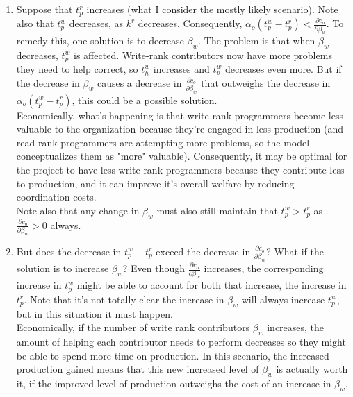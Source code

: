 \documentclass[source/paper/main.tex]{subfiles}
\begin{document}
\begin{enumerate}
    \item Suppose that $t_p^r$ increases (what I consider the mostly likely scenario). Note also that $t_p^w$ decreases, as $k^r$ decreases. Consequently, $\alpha_o(t_p^w - t_p^r) < \frac{\partial c_o}{\partial \beta_w}$. To remedy this, one solution is to decrease $\beta_w$. The problem is that when $\beta_w$ decreases, $t_p^w$ is affected. Write-rank contributors now have more problems they need to help correct, so $t_h^w$ increases and $t_p^w$ decreases even more. But if the decrease in $\beta_w$ causes a decrease in $\frac{\partial c_o}{\partial \beta_w}$ that outweighs the decrease in $\alpha_o(t_p^w - t_p^r)$, this could be a possible solution. \\
    Economically, what's happening is that write rank programmers become less valuable to the organization because they're engaged in less production (and read rank programmers are attempting more problems, so the model conceptualizes them as "more" valuable). Consequently, it may be optimal for the project to have less write rank programmers because they contribute less to production, and it can improve it's overall welfare by reducing coordination costs. \\
    
    Note also that any change in $\beta_w$ must also still maintain that $t_p^w > t_p^r$ as $\frac{\partial c_o}{\partial \beta_w} >0$ always. 
    
    \item  But does the decrease in $t_p^w - t_p^r$ exceed the decrease in $\frac{\partial c_o}{\partial \beta_w}$? What if the solution is to increase $\beta_w$? Even though $\frac{\partial c_o}{\partial \beta_w}$ increases, the corresponding increase in $t_p^w$ might be able to account for both that increase, the increase in $t_p^r$. Note that it's not totally clear the increase in $\beta_w$ will always increase $t_p^w$, but in this situation it must happen. \\
    Economically, if the number of write rank contributors $\beta_w$ increases, the amount of helping each contributor needs to perform decreases so they might be able to spend more time on production. In this scenario, the increased production gained means that this new increased level of $\beta_w$ is actually worth it, if the improved level of production outweighs the cost of an increase in $\beta_w$. \\
\end{enumerate}
\end{document}

